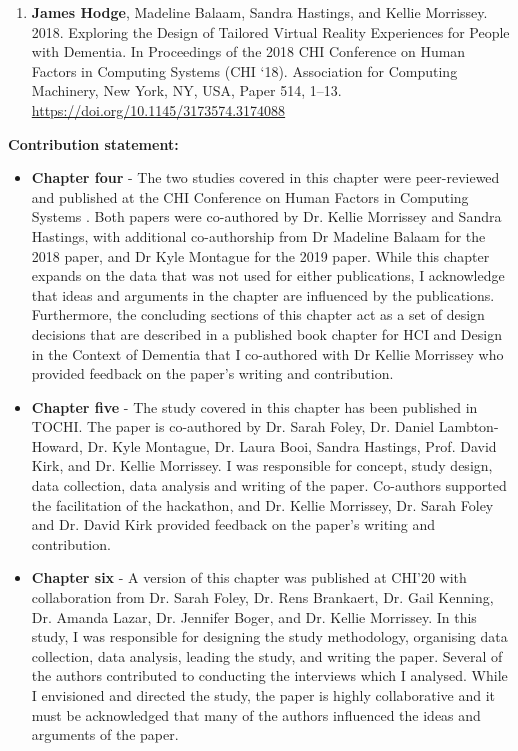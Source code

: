 \begin{enumerate}
    \item \textbf{James Hodge}, Madeline Balaam, Sandra Hastings, and Kellie Morrissey. 2018. Exploring the Design of Tailored Virtual Reality Experiences for People with Dementia. In Proceedings of the 2018 CHI Conference on Human Factors in Computing Systems (CHI `18). Association for Computing Machinery, New York, NY, USA, Paper 514, 1–13. \href{https://doi.org/10.1145/3173574.3174088}{https://doi.org/10.1145/3173574.3174088}

\end{enumerate}
\textbf{Contribution statement:} 
\begin{itemize}
    \item \textbf{Chapter four} - The two studies covered in this chapter were peer-reviewed and published at the CHI Conference on Human Factors in Computing Systems \citep{hodge_exploring_2018,hodge_exploring_2019}. Both papers were co-authored by Dr. Kellie Morrissey and Sandra Hastings, with additional co-authorship from Dr Madeline Balaam for the 2018 paper, and Dr Kyle Montague for the 2019 paper. While this chapter expands on the data that was not used for either publications, I acknowledge that ideas and arguments in the chapter are influenced by the publications. Furthermore, the concluding sections of this chapter act as a set of design decisions that are described in a published book chapter for HCI and Design in the Context of Dementia \citep{hodge2020sharing} that I co-authored with Dr Kellie Morrissey who provided feedback on the paper's writing and contribution. 

    \item \textbf{Chapter five} - The study covered in this chapter has been published in TOCHI. The paper is co-authored by Dr. Sarah Foley, Dr. Daniel Lambton-Howard, Dr. Kyle Montague, Dr. Laura Booi, Sandra Hastings, Prof. David Kirk, and Dr. Kellie Morrissey. I was responsible for concept, study design, data collection, data analysis and writing of the paper. Co-authors supported the facilitation of the hackathon, and Dr. Kellie Morrissey, Dr. Sarah Foley and Dr. David Kirk provided feedback on the paper's writing and contribution.
    
    \item \textbf{Chapter six} - A version of this chapter was published at CHI'20 \citep{hodge_relational_2020} with collaboration from  Dr. Sarah Foley, Dr. Rens Brankaert, Dr. Gail Kenning, Dr. Amanda Lazar, Dr. Jennifer Boger, and Dr. Kellie Morrissey. In this study, I was responsible for designing the study methodology, organising data collection, data analysis, leading the study, and writing the paper. Several of the authors contributed to conducting the interviews which I analysed. While I envisioned and directed the study, the paper is highly collaborative and it must be acknowledged that many of the authors influenced the ideas and arguments of the paper.


\end{itemize}
